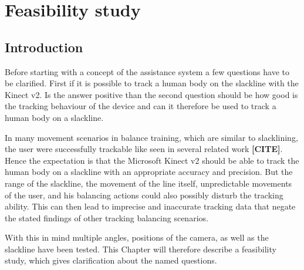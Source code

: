 \chapter{Feasibility study}
\section{Introduction}

Before starting with a concept of the assistance system a few questions have to be clarified. First if it is possible to track a human body on the slackline with the Kinect v2. Is the answer positive than the second question should be how good is the tracking behaviour of the device and can it therefore be used to track a human body on a slackline.

In many movement scenarios in balance training, which are similar to slacklining, the user were successfully trackable like seen in several related work \textbf{[CITE]}. Hence the expectation is that the Microsoft Kinect v2 should be able to track the human body on a slackline with an appropriate accuracy and precision. But the range of the slackline, the movement of the line itself, unpredictable movements of the user, and his balancing actions could also possibly disturb the tracking ability. This can then lead to imprecise and inaccurate tracking data that negate the stated findings of other tracking balancing scenarios.

With this in mind multiple angles, positions of the camera, as well as the slackline have been tested. This Chapter will therefore describe a feasibility study, which gives clarification about the named questions. 

